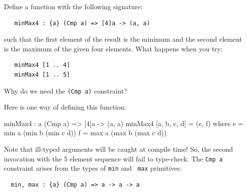 \begin{Exercise}\label{ex:fn:2}
Define a function with the following signature:
\begin{Verbatim}
   minMax4 : {a} (Cmp a) => [4]a -> (a, a)
\end{Verbatim}
such that the first element of the result is the minimum and the
second element is the maximum of the given four elements. What happens
when you try:
\begin{Verbatim}
   minMax4 [1 .. 4]
   minMax4 [1 .. 5]
\end{Verbatim}
\end{Exercise}
\noindent Why do we need the {\tt \Verb+(Cmp a)+} constraint?\indFin
\begin{Answer}
Here is one way of defining this function:\indMin\indMax
\begin{code}
  minMax4 : {a} (Cmp a) => [4]a -> (a, a)
  minMax4 [a, b, c, d] = (e, f)
      where   e = min a (min b (min c d))
              f = max a (max b (max c d))
\end{code}
Note that ill-typed arguments will be caught at compile time! So, the
second invocation with the 5 element sequence will fail to type-check.
The {\tt Cmp a} constraint arises from the types of {\tt min} and {\tt
  max} primitives:\indMin\indMax
\begin{Verbatim}
  min, max : {a} (Cmp a) => a -> a -> a
\end{Verbatim}
\end{Answer}

